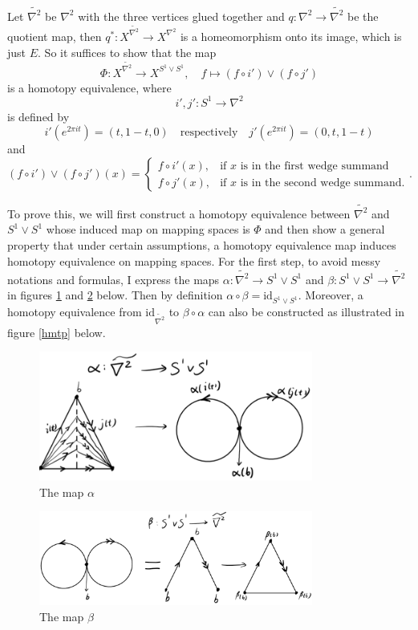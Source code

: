 \documentclass{article}
\begin{document}
Let $\widetilde{\nabla^2}$ be $\nabla^2$ with the three vertices glued together and $q\colon \nabla^2\rightarrow\widetilde{\nabla^2}$ be the quotient map, then $q^*\colon X^{\widetilde{\nabla^2}}\rightarrow X^{\nabla^2}$ is a homeomorphism onto its image, which is just $E.$ So it suffices to show that the map
\[\Phi\colon X^{\widetilde{\nabla^2}}\rightarrow X^{S^1\vee S^1},\quad f\mapsto (f\circ i')\vee(f\circ j')\]
is a homotopy equivalence, where
\[i',j'\colon S^1\rightarrow\nabla^2\]
is defined by
\[i'(e^{2\pi it})=(t,1-t,0)\quad\text{respectively}\quad j'(e^{2\pi it})=(0,t,1-t)\]
and
\[(f\circ i')\vee(f\circ j')(x)=\begin{cases}
                                  f\circ i'(x), & \mbox{if } x\text{ is in the first wedge summand} \\
                                  f\circ j'(x), & \mbox{if } x\text{ is in the second wedge summand}.
                                \end{cases}.
\]

To prove this, we will first construct a homotopy equivalence between $\widetilde{\nabla^2}$ and $S^1\vee S^1$ whose induced map on mapping spaces is $\Phi$ and then show a general property that under certain assumptions, a homotopy equivalence map induces homotopy equivalence on mapping spaces. For the first step, to avoid messy notations and formulas, I express the maps $\alpha\colon\widetilde{\nabla^2}\rightarrow S^1\vee S^1$ and $\beta\colon S^1\vee S^1\rightarrow\widetilde{\nabla^2}$ in figures \ref{alpha} and \ref{beta} below. Then by definition $\alpha\circ\beta=\text{id}_{S^1\vee S^1}.$ Moreover, a homotopy equivalence from $\text{id}_{\widetilde{\nabla^2}}$ to $\beta\circ\alpha$ can also be constructed as illustrated in figure \ref{hmtp} below.
\begin{figure}[h]
  \centering
  \includegraphics[width=9cm]{6.3_1}
  \caption{The map $\alpha$}\label{alpha}
\end{figure}

\begin{figure}[h]
  \centering
  \includegraphics[width=9cm]{6.3_2}
  \caption{The map $\beta$}\label{beta}
\end{figure}
\end{document}
